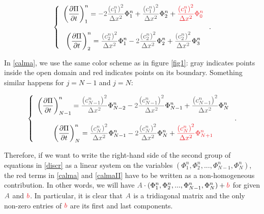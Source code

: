 \documentclass{article}
\begin{document}
\begin{equation}\label{calma}
\left\{\begin{array}{c}
\displaystyle\left(\frac{\partial \Pi}{\partial t}\right)^n_1=\textcolor{grayII}{-2\frac{\left(c^n_1\right)^2}{\Delta x^2}}\Phi^n_1+\textcolor{grayII}{\frac{\left(c^n_1\right)^2}{\Delta x^2}}\Phi^n_2+\textcolor{Red}{\frac{\left(c^n_1\right)^2}{\Delta x^2}\Phi^n_{0}}\\
\text{ }\\
\displaystyle\left(\frac{\partial \Pi}{\partial t}\right)^n_2=\textcolor{grayII}{\frac{\left(c^n_2\right)^2}{\Delta x^2}}\Phi^n_1-\textcolor{grayII}{2\frac{\left(c^n_2\right)^2}{\Delta x^2}}\Phi^n_2+\textcolor{grayII}{\frac{\left(c^n_2\right)^2}{\Delta x^2}}\Phi^n_3
\end{array}\right..
\end{equation}

In \eqref{calma}, we use the same color scheme as in figure \ref{fig1}: gray indicates points inside the open domain and red indicates points on its boundary. Something similar happens for $j=N-1$ and $j=N$:

\begin{equation}\label{calmaII}
\left\{\begin{array}{c}
\displaystyle\left(\frac{\partial \Pi}{\partial t}\right)^n_{N-1}=\textcolor{grayII}{\frac{\left(c^n_{N-1}\right)^2}{\Delta x^2}}\Phi^n_{N-2}-\textcolor{grayII}{2\frac{\left(c^n_{N-1}\right)^2}{\Delta x^2}}\Phi^n_{N-1}+\textcolor{grayII}{\frac{\left(c^n_{N-1}\right)^2}{\Delta x^2}}\Phi^n_N\\
\text{ }\\
\displaystyle\left(\frac{\partial \Pi}{\partial t}\right)^n_N=\textcolor{grayII}{\frac{\left(c^n_N\right)^2}{\Delta x^2}}\Phi^n_{N-1}-\textcolor{grayII}{2\frac{\left(c^n_N\right)^2}{\Delta x^2}}\Phi^n_N+\textcolor{Red}{\frac{\left(c^n_N\right)^2}{\Delta x^2}\Phi^n_{N+1}}
\end{array}\right..
\end{equation}

Therefore, if we want to write the right-hand side of the second group of equations in \eqref{discr} as a linear system on the variables $(\Phi^n_1,\Phi^n_2,...,\Phi^n_{N-1},\Phi^n_N)$, the red terms in \eqref{calma} and \eqref{calmaII} have to be written as a non-homogeneous contribution. In other words, we will have $\textcolor{grayII}{A}\cdot(\Phi^n_1,\Phi^n_2,...,\Phi^n_{N-1},\Phi^n_N)+\textcolor{Red}{b}$ for given $\textcolor{grayII}{A}$ and $\textcolor{Red}{b}$. In particular, it is clear that $\textcolor{grayII}{A}$ is a tridiagonal matrix and the only non-zero entries of $\textcolor{Red}{b}$ are its first and last components.
\end{document}
